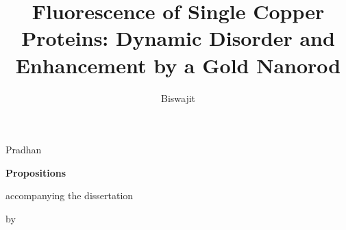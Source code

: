 \documentclass{dissertation}
\begin{document}
\title[]{Fluorescence of Single Copper Proteins: Dynamic Disorder and Enhancement by a Gold Nanorod}
\author{Biswajit}{Pradhan}

\begin{center}

{\Large\titlefont\bfseries Propositions}


accompanying the dissertation


{\makeatletter
\titlestyle\bfseries\large\@title
\makeatother}

{\makeatletter
\ifx\@subtitle\undefined\else
    \titlefont\titleshape\@subtitle
\fi
\makeatother}


by


\makeatletter
{\large\titlefont\bfseries\@firstname\ {\titleshape\@lastname}}
\makeatother

\end{center}
\end{document}
